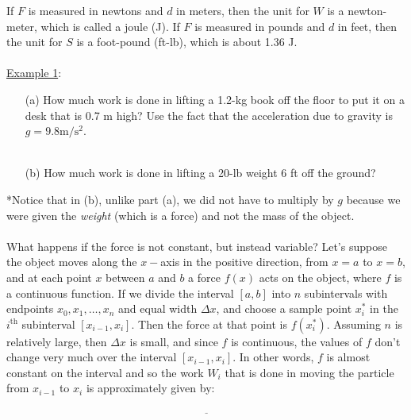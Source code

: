 \documentclass[paper=a4, fontsize=11pt]{scrartcl} %
\numberwithin{equation}{section} %
\numberwithin{figure}{section} %
\numberwithin{table}{section} %
\begin{document}
If $F$ is measured in newtons and $d$ in meters, then the unit for $W$ is a newton-meter, which is called a joule (J). If $F$ is measured in pounds and $d$ in feet, then the unit for $S$ is a foot-pound (ft-lb), which is about 1.36 J.\\
\indent\\
\newpage
\underline{Example 1}:
\begin{enumerate}
\item[(a)] How much work is done in lifting a 1.2-kg book off the floor to put it on a desk that is 0.7 m high? Use the fact that the acceleration due to gravity is $g=9.8\text{m}/\text{s}^2$.\\
\indent\\

\vspace{1.25in}

\item[(b)] How much work is done in lifting a 20-lb weight 6 ft off the ground?


\vspace{1.25in}

\end{enumerate}

*Notice that in (b), unlike part (a), we did not have to multiply by $g$ because we were given the \textit{weight} (which is a force) and not the mass of the object.\\
\indent\\

What happens if the force is not constant, but instead variable? Let's suppose the object moves along the $x-$axis in the positive direction, from $x=a$ to $x=b$, and at each point $x$ between $a$ and $b$ a force $f(x)$ acts on the object, where $f$ is a continuous function. If we divide the interval $[a,b]$ into $n$ subintervals with endpoints $x_0, x_1, \ldots, x_n$ and equal width $\Delta x$, and choose a sample point $x_i^*$ in the $i^{\text{th}}$ subinterval $[x_{i-1},x_i]$. Then the force at that point is $f(x_i^*)$. Assuming $n$ is relatively large, then $\Delta x$ is small, and since $f$ is continuous, the values of $f$ don't change very much over the interval $[x_{i-1},x_i]$. In other words, $f$ is almost constant on the interval and so the work $W_i$ that is done in moving the particle from $x_{i-1}$ to $x_i$ is approximately given by:\\
\indent\\

\[\underline{\hspace{2in}}\]
\indent\\
\end{document}
